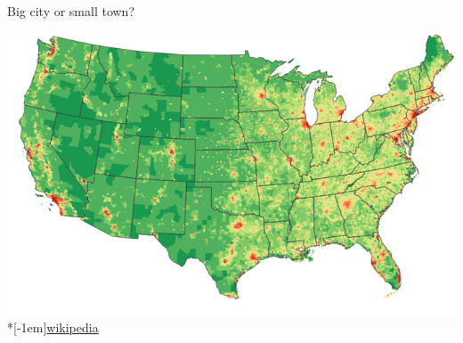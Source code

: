\begin{frame}[fragile]{Big city or small town?}
\begin{center}
\includegraphics[width=\textwidth]{750px-US_population_map}\\*[-1em]\hfill{\tiny \href{https://en.m.wikipedia.org/wiki/File:US_population_map.png}{wikipedia}}

\end{center}
\end{frame}


